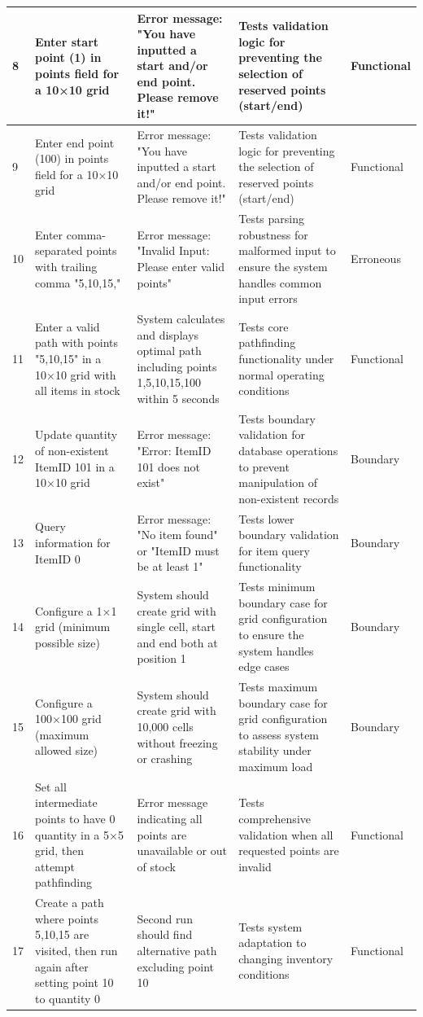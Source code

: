 \begin{longtable}{|p{}|p{}|p{}|p{}|p{}|}
\hline
8 & Enter start point (1) in points field for a 10×10 grid & Error message: "You have inputted a start and/or end point. Please remove it!" & Tests validation logic for preventing the selection of reserved points (start/end) & Functional \\
\hline
9 & Enter end point (100) in points field for a 10×10 grid & Error message: "You have inputted a start and/or end point. Please remove it!" & Tests validation logic for preventing the selection of reserved points (start/end) & Functional \\
\hline
10 & Enter comma-separated points with trailing comma "5,10,15," & Error message: "Invalid Input: Please enter valid points" & Tests parsing robustness for malformed input to ensure the system handles common input errors & Erroneous \\
\hline
11 & Enter a valid path with points "5,10,15" in a 10×10 grid with all items in stock & System calculates and displays optimal path including points 1,5,10,15,100 within 5 seconds & Tests core pathfinding functionality under normal operating conditions & Functional \\
\hline
12 & Update quantity of non-existent ItemID 101 in a 10×10 grid & Error message: "Error: ItemID 101 does not exist" & Tests boundary validation for database operations to prevent manipulation of non-existent records & Boundary \\
\hline
13 & Query information for ItemID 0 & Error message: "No item found" or "ItemID must be at least 1" & Tests lower boundary validation for item query functionality & Boundary \\
\hline
14 & Configure a 1×1 grid (minimum possible size) & System should create grid with single cell, start and end both at position 1 & Tests minimum boundary case for grid configuration to ensure the system handles edge cases & Boundary \\
\hline
15 & Configure a 100×100 grid (maximum allowed size) & System should create grid with 10,000 cells without freezing or crashing & Tests maximum boundary case for grid configuration to assess system stability under maximum load & Boundary \\
\hline
16 & Set all intermediate points to have 0 quantity in a 5×5 grid, then attempt pathfinding & Error message indicating all points are unavailable or out of stock & Tests comprehensive validation when all requested points are invalid & Functional \\
\hline
17 & Create a path where points 5,10,15 are visited, then run again after setting point 10 to quantity 0 & Second run should find alternative path excluding point 10 & Tests system adaptation to changing inventory conditions & Functional \\

\end{longtable}
